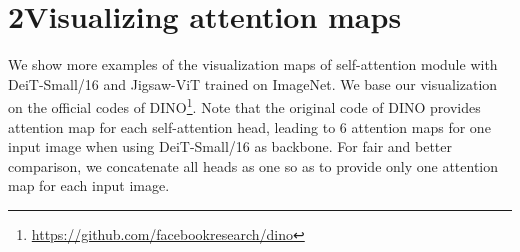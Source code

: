\documentclass{article}
\begin{document}
\captionsetup[table]{farskip=2pt,captionskip=1pt,aboveskip=4pt}
    \begin{table}[t]
        \centering
        \renewcommand{\arraystretch}{1.1}
        \caption{{\textbf{Image classification on ImageNet-1K~\cite{deng2009imagenet} validation set and ImageNet V2~\cite{recht2019imagenet}.} 
        We compare to Swin~\cite{liu2021swin} with different capacities and report top-1 accuracy ().
        We also show how much each Jigsaw-ViT model is above or below the baseline, which are marked with \textcolor{ForestGreen}{} and \textcolor{RedOrange}{} respectively.}}
        \label{tab::supp-swin}
\end{table}

\section*{2\quad Visualizing attention maps}
We show more examples of the visualization maps of  self-attention module with DeiT-Small/16 and Jigsaw-ViT trained on ImageNet. 
We base our visualization on the official codes of DINO\footnote{\label{note1}\url{https://github.com/facebookresearch/dino}}.
Note that the original code of DINO provides attention map for each self-attention head, leading to 6 attention maps for one input image when using DeiT-Small/16 as backbone.
For fair and better comparison, we concatenate all heads as one so as to provide only one attention map for each input image.
\end{document}
